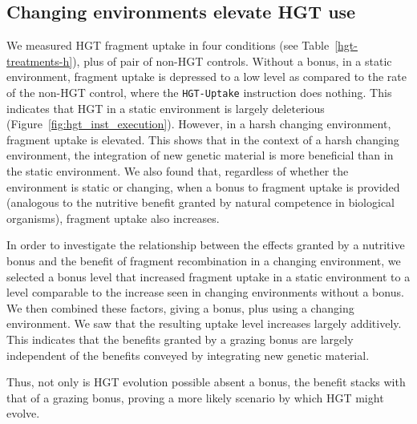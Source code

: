 \documentclass[PhD]{msu-thesis}
\begin{document}
\subsection{Changing environments elevate HGT use}

We measured HGT fragment uptake in four conditions (see Table~\ref{hgt-treatments-h}), plus of pair of non-HGT controls. Without a bonus, in a static environment, fragment uptake is depressed to a low level as compared to the rate of the non-HGT control, where the \texttt{HGT-Uptake} instruction does nothing. This indicates that HGT in a static environment is largely deleterious (Figure~\ref{fig:hgt_inst_execution}). However, in a harsh changing environment, fragment uptake is elevated. This shows that in the context of a harsh changing environment, the integration of new genetic material is more beneficial than in the static environment. We also found that, regardless of whether the environment is static or changing, when a bonus to fragment uptake is provided (analogous to the nutritive benefit granted by natural competence in biological organisms), fragment uptake also increases. 

In order to investigate the relationship between the effects granted by a nutritive bonus and the benefit of fragment recombination in a changing environment, we selected a bonus level that increased fragment uptake in a static environment to a level comparable to the increase seen in changing environments without a bonus. We then combined these factors, giving a bonus, plus using a changing environment. We saw that the resulting uptake level increases largely additively. This indicates that the benefits granted by a grazing bonus are largely independent of the benefits conveyed by integrating new genetic material. 

Thus, not only is HGT evolution possible absent a bonus, the benefit stacks with that of a grazing bonus, proving a more likely scenario by which HGT might evolve. %
\end{document}
